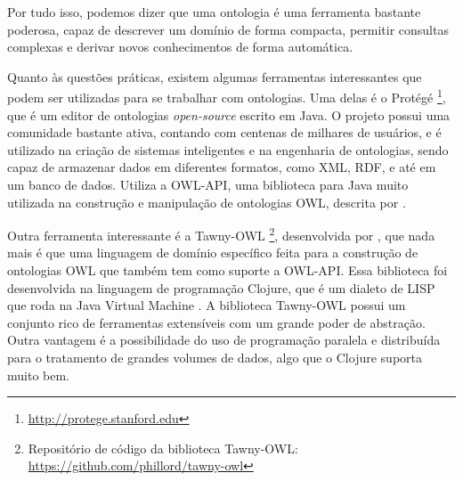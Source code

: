 Por tudo isso, podemos dizer que uma ontologia é uma ferramenta bastante poderosa, capaz de descrever um domínio de forma compacta, permitir consultas complexas e derivar novos conhecimentos de forma automática.

Quanto às questões práticas, existem algumas ferramentas interessantes que
podem ser utilizadas para se trabalhar com ontologias. Uma delas é o Protégé \footnote{\url{http://protege.stanford.edu}},
que é um editor de ontologias \textit{open-source} escrito em Java. O projeto possui uma comunidade bastante ativa, contando com centenas de milhares de usuários, e é utilizado na criação de sistemas inteligentes e na engenharia de ontologias, sendo capaz de armazenar dados em diferentes formatos, como XML, RDF, e até em um banco de dados. Utiliza a OWL-API, uma biblioteca para Java muito utilizada na construção e manipulação de ontologias OWL, descrita por \citet{Horridge:2011:OAJ:2019470.2019471}.

Outra ferramenta interessante é a Tawny-OWL \footnote{Repositório de código da biblioteca Tawny-OWL: \url{https://github.com/phillord/tawny-owl}}, desenvolvida por \citet{DBLP:journals/corr/abs-1303-0213}, que nada mais é que uma linguagem de domínio específico feita para a construção de ontologias OWL que também tem como suporte a OWL-API. Essa biblioteca foi desenvolvida na linguagem de programação Clojure, que é um dialeto de LISP que roda na Java Virtual Machine \citep{hickey2008}. A biblioteca Tawny-OWL possui um conjunto rico de ferramentas extensíveis com um grande poder de abstração. Outra vantagem é a possibilidade do uso de programação paralela e distribuída para o tratamento de grandes volumes de dados, algo que o Clojure suporta muito bem.
